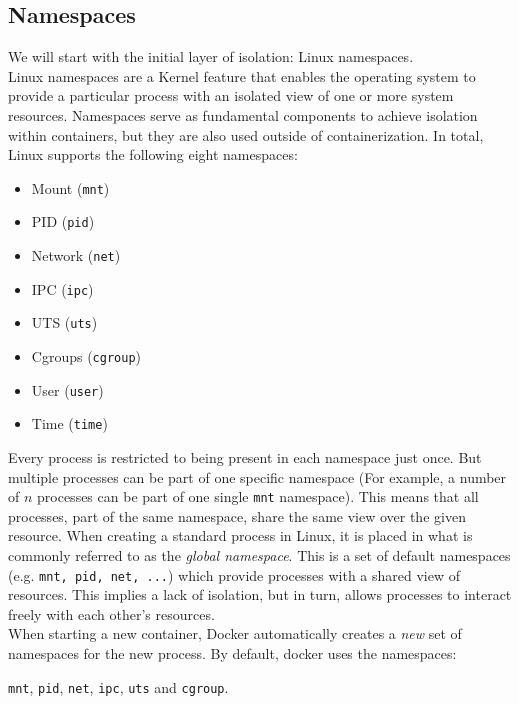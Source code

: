 \documentclass{article}
\begin{document}
\subsection{Namespaces} \label{sec:namespaces}
We will start with the initial layer of isolation: Linux namespaces. \\
Linux namespaces are a Kernel feature that enables the operating system to 
provide a particular process with an isolated view of one or more system resources. 
Namespaces serve as fundamental components to achieve isolation within containers, 
but they are also used outside of containerization. In total, Linux supports the following eight namespaces:
\begin{multicols}{2}
    \begin{itemize}[itemsep=0pt]
        \item Mount (\texttt{mnt})
        \item PID (\texttt{pid})
        \item Network (\texttt{net})
        \item IPC (\texttt{ipc})
        \item UTS (\texttt{uts})
        \item Cgroups (\texttt{cgroup})
        \item User (\texttt{user})
        \item Time (\texttt{time})
    \end{itemize}
\end{multicols}
\noindent
Every process is restricted to being present in each namespace just once. But multiple processes can 
be part of one specific namespace (For example, a number of $n$ processes can be part of one 
single \texttt{mnt} namespace). This means that all processes, part of the same namespace, 
share the same view over the given resource. When creating a standard process in Linux, it is 
placed in what is commonly referred to as the \textit{global namespace}. 
This is a set of default namespaces (e.g. \texttt{mnt, pid, net, ...}) 
which provide processes with a shared view of resources. 
This implies a lack of isolation, but in turn, allows processes to interact freely with each other's resources.\\
When starting a new container, Docker automatically creates a \textit{new} set of namespaces for the new process. 
By default, docker uses the namespaces:
\vspace{-5pt}
\begin{center}
    \texttt{mnt}, \texttt{pid}, \texttt{net}, \texttt{ipc}, \texttt{uts} and \texttt{cgroup}.
\end{center}
\end{document}
